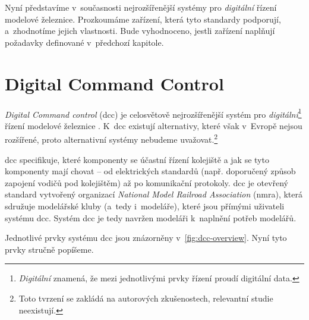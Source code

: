 Nyní představíme v~současnosti nejrozšířenější systémy pro \textit{digitální}
řízení modelové železnice. Prozkoumáme zařízení, která tyto standardy
podporují, a~zhodnotíme jejich vlastnosti. Bude vyhodnoceno, jestli zařízení
naplňují požadavky definované v~předchozí kapitole.

\section{Digital Command Control} \label{sec:dcc}

\textit{Digital Command control} (\gls{dcc}) je celosvětově nejrozšířenější
systém pro \textit{digitální}\footnote{\textit{Digitální} znamená, že mezi
jednotlivými prvky řízení proudí digitální data.} řízení modelové železnice
\cite{dcc_systems:web}. K~\gls{dcc} existují alternativy, které však v~Evropě
nejsou rozšířené, proto alternativní systémy nebudeme uvažovat.\footnote{Toto
tvrzení se zakládá na autorových zkušenostech, relevantní studie neexistují.}

\gls{dcc} specifikuje, které komponenty se účastní řízení kolejiště a jak se
tyto komponenty mají chovat – od elektrických standardů (např. doporučený
způsob zapojení vodičů pod kolejištěm) až po komunikační protokoly. \gls{dcc}
je otevřený standard vytvořený organizací \textit{National Model Railroad
Association} (\gls{nmra}), která sdružuje modelářské kluby (a~tedy i~modeláře),
které jsou přímými uživateli systému \gls{dcc}. Systém \gls{dcc} je tedy
navržen modeláři k~naplnění potřeb modelářů.

Jednotlivé prvky systému \gls{dcc} jsou znázorněny v~\ref{fig:dcc-overview}.
Nyní tyto prvky stručně popíšeme.

